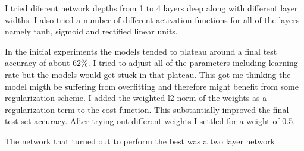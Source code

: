 I tried diferent network depths from 1 to 4 layers deep along with different layer widths. I also tried a number of different activation functions for all of the layers namely tanh, sigmoid and rectified linear units.

In the initial experiments the models tended to plateau around a final test accuracy of about 62\%. I tried to adjust all of the parameters including learning rate but the models would get stuck in that plateau. This got me thinking the model migth be suffering from overfitting and therefore might benefit from some regularization scheme. I added the weighted l2 norm of the weights as a regularization term to the cost function. This substantially improved the final test set accuracy. After trying out different weights I settled for a weight of 0.5.

The network that turned out to perform the best was a two layer network
